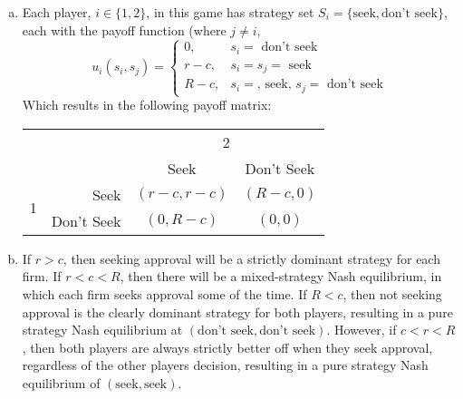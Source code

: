 \documentclass{article}
\begin{document}
\begin{enumerate}[(a)]
	\item Each player, $i\in\{1,2\}$, in this game has strategy set $S_i=\{\text{seek},\text{don't seek}\}$, each with the payoff function (where $j\neq i$,
		\[
			u_i(s_i,s_j) = 
				\begin{cases} 
					0, 		& s_i = \text{ don't seek} \\ 
					r - c, 	& s_i = s_j = \text{ seek} \\ 
					R - c, 	& s_i = \text{, seek, } s_j = \text{ don't seek} 
				\end{cases}
		\]
		Which results in the following payoff matrix:
		\begin{center}
			\begin{tabular}{crcc}
			&					& \multicolumn{2}{c}{2}													\\
			&					& Seek								& Don't Seek						\\ \cline{3-4} 
			\multirow{2}{*}{1}						
			& Seek				& \multicolumn{1}{|c|}{$(r-c,r-c)$}	& \multicolumn{1}{|c|}{$(R-c,0)$}	\\ \cline{3-4}
			& Don't Seek		& \multicolumn{1}{|c|}{$(0,R-c)$}	& \multicolumn{1}{|c|}{$(0,0)$}		\\ \cline{3-4}
			
			\end{tabular}
		\end{center}
		
	\item If $r>c$, then seeking approval will be a strictly dominant strategy for each firm. If $r<c<R$, then there will be a mixed-strategy Nash equilibrium, in which each firm seeks approval some of the time. If $R<c$, then not seeking approval is the clearly dominant strategy for both players, resulting in a pure strategy Nash equilibrium at $(\text{don't seek},\text{don't seek})$. However, if $c<r<R$, then both players are always strictly better off when they seek approval, regardless of the other players decision, resulting in a pure strategy Nash equilibrium of $(\text{seek},\text{seek})$.
\end{enumerate}


\end{document}
